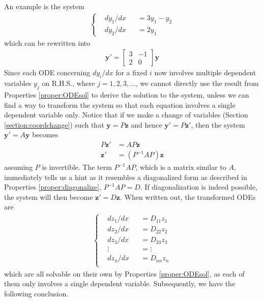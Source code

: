 An example is the system
\begin{align*}
\left\{\begin{alignedat}{2}
&dy_1/dx & &= 3y_1 - y_2 \\
&dy_2/dx & &= 2y_1
\end{alignedat}\right.
\end{align*}
which can be rewritten into
\begin{align*}
\textbf{y}' =
\begin{bmatrix}
3 & -1 \\
2 & 0
\end{bmatrix}
\textbf{y}
\end{align*}
Since each ODE concerning $dy_i/dx$ for a fixed $i$ now involves multiple dependent variables $y_j$ on R.H.S., where $j = 1,2,3,\ldots$, we cannot directly use the result from Properties \ref{proper:ODEsol} to derive the solution to the system, unless we can find a way to transform the system so that each equation involves a single dependent variable only. Notice that if we make a change of variables (Section \ref{section:coordchange}) such that $\textbf{y} = P\textbf{z}$ and hence $\textbf{y}' = P\textbf{z}'$, then the system $\textbf{y}' = A\textbf{y}$ becomes
\begin{align*}
P\textbf{z}' &= AP\textbf{z} \\
\textbf{z}' &= (P^{-1}AP)\textbf{z}
\end{align*}
assuming $P$ is invertible. The term $P^{-1}AP$, which is a matrix similar to $A$, immediately tells us a hint as it resembles a diagonalized form as described in Properties \ref{proper:diagonalize}, $P^{-1}AP = D$. If diagonalization is indeed possible, the system will then become $\textbf{z}' = D\textbf{z}$. When written out, the transformed ODEs are
\begin{align}
\label{eqn:ODEDz}
\left\{\begin{alignedat}{2}
& dz_1/dx & &= D_{11}z_1 \\
& dz_2/dx & &= D_{22}z_2 \\
& dz_3/dx & &= D_{33}z_3 \\
& \vdots & &= \vdots \\
& dz_n/dx & &= D_{nn}z_n \\
\end{alignedat}\right.    
\end{align}
which are all solvable on their own by Properties \ref{proper:ODEsol}, as each of them only involves a single dependent variable. Subsequently, we have the following conclusion.
